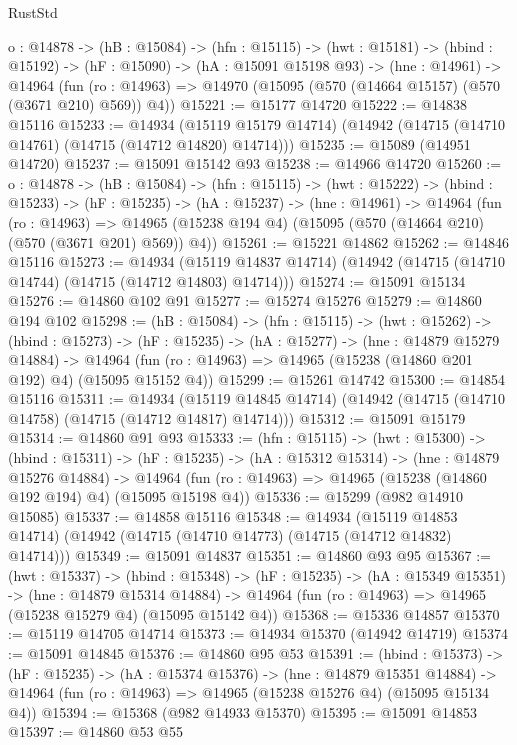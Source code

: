 \begin{lexlean}{RustStd}
\begin{coremodule}
  {o : @14878} ->
  (hB : @15084) ->
  (hfn : @15115) ->
  (hwt : @15181) ->
  (hbind : @15192) ->
  (hF : @15090) ->
  (hA : @15091 @15198 @93) ->
  (hne : @14961) ->
  @14964 (fun (ro : @14963) => @14970 (@15095 (@570 (@14664 @15157) (@570 (@3671 @210) @569)) @4))
@15221 := @15177 @14720
@15222 := @14838 @15116
@15233 := @14934
    (@15119 @15179 @14714)
    (@14942 (@14715 (@14710 @14761) (@14715 (@14712 @14820) @14714)))
@15235 := @15089 (@14951 @14720)
@15237 := @15091 @15142 @93
@15238 := @14966 @14720
@15260 := {o : @14878} ->
  (hB : @15084) ->
  (hfn : @15115) ->
  (hwt : @15222) ->
  (hbind : @15233) ->
  (hF : @15235) ->
  (hA : @15237) ->
  (hne : @14961) ->
  @14964
    (fun (ro : @14963) =>
    @14965 (@15238 @194 @4) (@15095 (@570 (@14664 @210) (@570 (@3671 @201) @569)) @4))
@15261 := @15221 @14862
@15262 := @14846 @15116
@15273 := @14934
    (@15119 @14837 @14714)
    (@14942 (@14715 (@14710 @14744) (@14715 (@14712 @14803) @14714)))
@15274 := @15091 @15134
@15276 := @14860 @102 @91
@15277 := @15274 @15276
@15279 := @14860 @194 @102
@15298 := (hB : @15084) ->
  (hfn : @15115) ->
  (hwt : @15262) ->
  (hbind : @15273) ->
  (hF : @15235) ->
  (hA : @15277) ->
  (hne : @14879 @15279 @14884) ->
  @14964 (fun (ro : @14963) => @14965 (@15238 (@14860 @201 @192) @4) (@15095 @15152 @4))
@15299 := @15261 @14742
@15300 := @14854 @15116
@15311 := @14934
    (@15119 @14845 @14714)
    (@14942 (@14715 (@14710 @14758) (@14715 (@14712 @14817) @14714)))
@15312 := @15091 @15179
@15314 := @14860 @91 @93
@15333 := (hfn : @15115) ->
  (hwt : @15300) ->
  (hbind : @15311) ->
  (hF : @15235) ->
  (hA : @15312 @15314) ->
  (hne : @14879 @15276 @14884) ->
  @14964 (fun (ro : @14963) => @14965 (@15238 (@14860 @192 @194) @4) (@15095 @15198 @4))
@15336 := @15299 (@982 @14910 @15085)
@15337 := @14858 @15116
@15348 := @14934
    (@15119 @14853 @14714)
    (@14942 (@14715 (@14710 @14773) (@14715 (@14712 @14832) @14714)))
@15349 := @15091 @14837
@15351 := @14860 @93 @95
@15367 := (hwt : @15337) ->
  (hbind : @15348) ->
  (hF : @15235) ->
  (hA : @15349 @15351) ->
  (hne : @14879 @15314 @14884) ->
  @14964 (fun (ro : @14963) => @14965 (@15238 @15279 @4) (@15095 @15142 @4))
@15368 := @15336 @14857
@15370 := @15119 @14705 @14714
@15373 := @14934 @15370 (@14942 @14719)
@15374 := @15091 @14845
@15376 := @14860 @95 @53
@15391 := (hbind : @15373) ->
  (hF : @15235) ->
  (hA : @15374 @15376) ->
  (hne : @14879 @15351 @14884) ->
  @14964 (fun (ro : @14963) => @14965 (@15238 @15276 @4) (@15095 @15134 @4))
@15394 := @15368 (@982 @14933 @15370)
@15395 := @15091 @14853
@15397 := @14860 @53 @55

\end{coremodule}
\end{lexlean}
